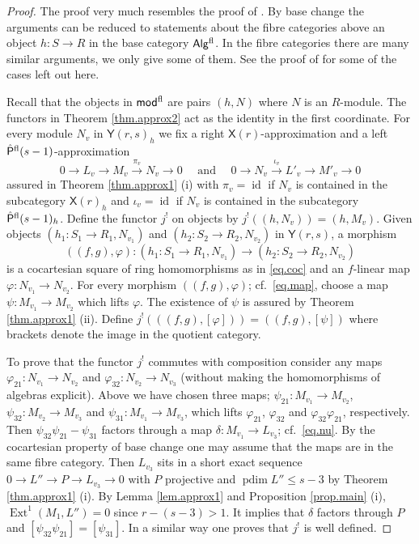 \documentclass[a4paper,10pt]{amsart}
\theoremstyle{plain}
\theoremstyle{definition}
\theoremstyle{remark}
\numberwithin{equation}{xx}
\DeclareMathOperator{\Ext}{Ext}
\DeclareMathOperator{\id}{id}
\DeclareMathOperator{\pdim}{pdim}
\newcommand{\co}{\colon}
\newcommand{\ra}{\rightarrow}
\newcommand{\lra}{\longrightarrow}
\newcommand{\Algf}{\cat{Alg}{}^{\textnormal{fl}}}
\newcommand{\Pf}{\hat{\cat{P}}{}^{\textnormal{fl}}}
\newcommand{\modf}{\cat{mod}{}^{\textnormal{fl}}}
\renewcommand{\phi}{\varphi}
\renewcommand{\leq}{\leqslant}
\newcommand{\cat}[1]{\mathsf{{#1}}}
\newcommand{\xra}[1]{\xrightarrow{{#1}}}
\newcommand{\xt}[4]{{\Ext} _{#2}^{#1}({#3},{#4})}
\begin{document}
\begin{proof}
The proof very much resembles the proof of \cite[4.5]{ile:12a}. By 
base change the arguments can be reduced to statements about the fibre categories above an object \(h\co S\ra R\) in the base category \(\Algf\). In the fibre categories there are many similar arguments, we only give some of them. See the proof of \cite[4.5]{ile:12a} for some of the cases left out here.

Recall that the objects in \(\modf\) are pairs \((h,N)\) where \(N\) is an \(R\)-module. The functors in Theorem \ref{thm.approx2} act as the identity in the first coordinate.  
For every module \(N_{v}\) in \(\cat{Y}(r,s)_{h}\) we fix a right \(\cat{X}(r)\)-approximation and a left \(\Pf(s-1)\)-approximation 
\begin{equation}\label{eq.nu}
0\ra L_{v}\lra  M_{v}\xra{\pi_{v}} N_{v}\ra 0\quad \text{ and }\quad 0\ra N_{v}\xra{\iota_{v}} L'_{v}\lra M'_{v}\ra 0
\end{equation}
assured in Theorem \ref{thm.approx1} (i)
with \(\pi_{v}=\id\) if \(N_{v}\) is contained in the subcategory \(\cat{X}(r)_{h}\) and \(\iota_{v}=\id\) if \(N_{v}\) is contained in the subcategory \(\Pf(s-1)_{h}\).
Define the functor \(j^{!}\) on objects by \(j^{!}((h,N_{v}))=(h,M_{v})\). 
Given objects \((h_{1}\co S_{1}\ra R_{1},N_{v_{1}})\) and \((h_{2}\co S_{2}\ra R_{2},N_{v_{2}})\) in \(\cat{Y}(r,s)\), a morphism 
\begin{equation}\label{eq.map}
((f,g),\phi)\co(h_{1}\co S_{1}\ra R_{1},N_{v_{1}})\ra (h_{2}\co S_{2}\ra R_{2},N_{v_{2}})
\end{equation}
is a cocartesian square of ring homomorphisms as in \eqref{eq.coc} and an \(f\)-linear map \(\phi\co N_{v_{1}}\ra N_{v_{2}}\). For every morphism \(((f,g),\phi)\); cf.\ \eqref{eq.map}, choose a map \(\psi\co M_{v_{1}}\ra M_{v_{2}}\) which lifts \(\phi\). The existence of \(\psi\) is assured by Theorem \ref{thm.approx1} (ii). Define \(j^{!}(((f,g),[\phi]))=((f,g),[\psi])\) where brackets denote the image in the quotient category.

To prove that the functor \(j^{!}\) commutes with composition consider any maps \(\phi_{21}\co N_{v_{1}}\ra N_{v_{2}}\) and \(\phi_{32}\co N_{v_{2}}\ra N_{v_{3}}\) (without making the homomorphisms of algebras explicit). Above we have chosen three maps; \(\psi_{21}\co M_{v_{1}}\ra M_{v_{2}}\), \(\psi_{32}\co M_{v_{2}}\ra M_{v_{3}}\) and \(\psi_{31}\co M_{v_{1}}\ra M_{v_{3}}\), which lifts \(\phi_{21}\), \(\phi_{32}\) and \(\phi_{32}\phi_{21}\), respectively. Then \(\psi_{32}\psi_{21}-\psi_{31}\) factors through a map \(\delta\co M_{v_{1}}\ra L_{v_{3}}\); cf.\ \eqref{eq.nu}. By the cocartesian property of base change one may assume that the maps are in the same fibre category. Then \(L_{v_{3}}\) sits in a short exact sequence \(0\ra L''\ra P\ra L_{v_{3}}\ra 0\) with \(P\) projective and \(\pdim L''\leq s-3\) by Theorem \ref{thm.approx1} (i). By Lemma \ref{lem.approx1} and Proposition \ref{prop.main} (i), \(\xt{1}{}{M_{1}}{L''}=0\) since \(r-(s-3)>1\). It implies that \(\delta\) factors through \(P\) and \([\psi_{32}\psi_{21}]=[\psi_{31}]\). In a similar way one proves that \(j^{!}\) is well defined. 


\end{proof}
\end{document}
